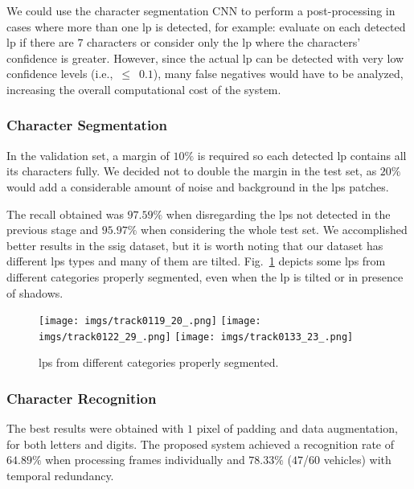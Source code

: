 We could use the character segmentation CNN to perform a post-processing in cases where more than one \gls*{lp} is detected, for example: evaluate on each detected \gls*{lp} if there are $7$ characters or consider only the \gls*{lp} where the characters’ confidence is greater. However, since the actual \gls*{lp} can be detected with very low confidence levels (i.e.,~$\leq$~$0.1$), many false negatives would have to be analyzed, increasing the overall computational cost of the system.

\subsubsection{Character Segmentation}

In the validation set, a margin of $10\%$ is required so each detected \gls*{lp} contains all its characters fully. We decided not to double the margin in the test set, as $20\%$ would add a considerable amount of noise and background in the \glspl*{lp} patches.

The recall obtained was $97.59\%$ when disregarding the \glspl*{lp} not detected in the previous stage and $95.97\%$ when considering the whole test set. We accomplished better results in the \gls*{ssig} dataset, but it is worth noting that our dataset has different \glspl*{lp} types and many of them are tilted.
Fig.~\ref{fig:dataset_cs_samples} depicts some \glspl*{lp} from different categories properly segmented, even when the \gls*{lp} is tilted or in presence of shadows.

\begin{figure}[!htb]
	\centering
	\texttt{[image: imgs/track0119\_20\_.png]}
	\texttt{[image: imgs/track0122\_29\_.png]}
	\texttt{[image: imgs/track0133\_23\_.png]}
	\caption{\glspl*{lp} from different categories properly segmented.}
	\label{fig:dataset_cs_samples}    
\end{figure}

\subsubsection{Character Recognition}

The best results were obtained with $1$ pixel of padding and data augmentation, for both letters and digits. The proposed system achieved a recognition rate of $64.89\%$ when processing frames individually and $78.33\%$ ($47$/$60$ vehicles) with temporal redundancy. 


